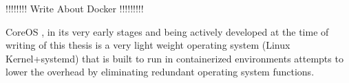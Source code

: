 !!!!!!!! Write About Docker !!!!!!!!!


CoreOS \cite{coreos}, in its very early stages and being actively developed at the time of writing of this thesis is a very light weight operating system (Linux Kernel+systemd) that is built to run in containerized environments attempts to lower the overhead by eliminating redundant operating system functions.












